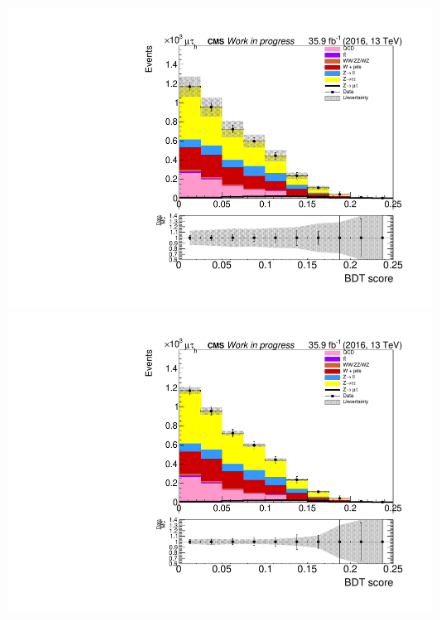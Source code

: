 \begin{figure}[htp]
	\begin{multicols}{2}
		\includegraphics[width=\linewidth]{plots/mt/OneJet_prefit.pdf}\par 
		\includegraphics[width=\linewidth]{plots/mt/OneJet_postfit.pdf}\par
	\end{multicols}
\end{figure}


